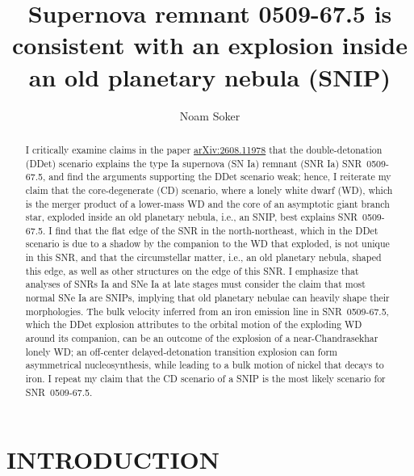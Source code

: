 \documentclass[twocolumn]{aastex701}
\begin{document}
\title{Supernova remnant 0509-67.5 is consistent with an explosion inside an old planetary nebula (SNIP)}

\author[0000-0003-0375-8987]{Noam Soker}



\begin{abstract}
I critically examine claims in the paper \href{https://arxiv.org/abs/2608.11978}{arXiv:2608.11978}  that the double-detonation (DDet) scenario explains the type Ia supernova (SN Ia) remnant (SNR Ia) SNR~0509-67.5, and find the arguments supporting the DDet scenario weak; hence, I reiterate my claim that the core-degenerate (CD) scenario, where a lonely white dwarf (WD), which is the merger product of a lower-mass WD and the core of an asymptotic giant branch star,  exploded inside an old planetary nebula, i.e., an SNIP, best explains  SNR~0509-67.5. I find that the flat edge of the SNR in the north-northeast, which in the DDet scenario is due to a shadow by the companion to the WD that exploded, is not unique in this SNR, and that the circumstellar matter, i.e., an old planetary nebula, shaped this edge, as well as other structures on the edge of this SNR. I emphasize that analyses of SNRs Ia and SNe Ia at late stages must consider the claim that most normal SNe Ia are SNIPs, implying that old planetary nebulae can heavily shape their morphologies. The bulk velocity inferred from an iron emission line in SNR~0509-67.5, which the DDet explosion attributes to the orbital motion of the exploding WD around its companion, can be an outcome of the explosion of a near-Chandrasekhar lonely WD; an off-center delayed-detonation transition explosion can form asymmetrical nucleosynthesis, while leading to a bulk motion of nickel that decays to iron. I repeat my claim that the CD scenario of a SNIP is the most likely scenario for SNR~0509-67.5. 
\end{abstract}


\section{INTRODUCTION}
\label{sec:intro}
\end{document}
